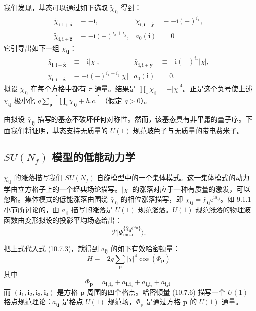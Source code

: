 我们发现，基态可以通过如下选取 $\tilde\chi_{\pmb i\pmb j}$ 得到：
\begin{align*}
\tilde\chi_{\pmb i,\pmb i+\hat{\pmb x}}&\equiv-\mathrm{i}, & \tilde\chi_{\pmb i,\pmb i+\hat{\pmb y}}&\equiv-\mathrm{i}(-)^{i_x},\\
\tilde\chi_{\pmb i,\pmb i+\hat{\pmb z}}&\equiv-\mathrm{i}(-)^{i_x+i_y}, & a_0(\pmb i)&=0
\end{align*}
它引导出如下一组 $\chi_{\pmb i\pmb j}$：
\begin{align*}
\bar\chi_{\pmb i,\pmb i+\hat{\pmb x}}&\equiv-\mathrm{i}|\chi|, & \bar\chi_{\pmb i,\pmb i+\hat{\pmb y}}&\equiv-\mathrm{i}(-)^{i_x}|\chi|,\\
\bar\chi_{\pmb i,\pmb i+\hat{\pmb z}}&\equiv-\mathrm{i}(-)^{i_x+i_y}|\chi| & a_0(\pmb i)&=0.\tag{10.7.4}
\end{align*}
拟设 $\bar\chi_{\pmb i\pmb j}$ 在每个方格中都有 $\pi$ 通量。结果是 $\prod_{\square}\chi_{\pmb i\pmb j}=-|\chi|^{4}$。正是这个负号使上述 $\chi_{\pmb i\pmb j}$ 极小化 $g\sum_{\pmb p}[\prod_{\square}\chi_{\pmb i\pmb j}+h.c.]$（假定 $g>0$）。

由拟设 $\bar\chi_{\pmb i\pmb j}$ 描写的基态不破坏任何对称性。然而，该基态具有非平庸的量子序。下面我们将证明，基态支持无质量的 $U(1)$ 规范玻色子与无质量的带电费米子。

\subsection{$SU(N_f)$ 模型的低能动力学}

$\chi_{\pmb i\pmb j}$ 的涨落描写我们 $SU(N_f)$ 自旋模型中的一个集体模式。这一集体模式的动力学由立方格子上的一个经典场论描写。$|\chi|$ 的涨落对应于一种有质量的激发，可以忽略。集体模式的低能涨落由围绕 $\bar\chi_{\pmb i\pmb j}$ 的相位涨落描写，即 $\chi_{\pmb i\pmb j}=\bar\chi_{\pmb i\pmb j}\mathrm{e}^{\mathrm{i}a_{\pmb i\pmb j}}$。如 9.1.1 小节所讨论的，由 $a_{\pmb i\pmb j}$ 描写的涨落是 $U(1)$ 规范涨落。$U(1)$ 规范涨落的物理波函数由变形拟设的投影平均场态给出：
\begin{equation*}
\mathcal P|\Psi^{\{\bar\chi_{\pmb i\pmb j}\mathrm{e}^{\mathrm{i}a_{\pmb i\pmb j}}\}}_{\mathrm{mean}}\rangle.\tag{10.7.5}
\end{equation*}

把上式代入式 (10.7.3)，就得到 $a_{\pmb i\pmb j}$ 的如下有效哈密顿量：
\begin{equation*}
H=-2g\sum_{\pmb p}|\chi|^{4}\cos(\Phi_{\pmb p})\tag{10.7.6}
\end{equation*}
其中
\begin{equation*}
\Phi_{\pmb p}=a_{\pmb i_1\pmb i_2}+a_{\pmb i_2\pmb i_3}+a_{\pmb i_3\pmb i_4}+a_{\pmb i_4\pmb i_1}
\end{equation*}
而 $(\pmb i_1,\pmb i_2,\pmb i_3,\pmb i_4)$ 是方格 $\pmb p$ 周围的四个格点。哈密顿量 (10.7.6) 描写一个 $U(1)$ 格点规范理论：$a_{\pmb i\pmb j}$ 是格点 $U(1)$ 规范场，$\Phi_{\pmb p}$ 是通过方格 $\pmb p$ 的 $U(1)$ 通量。

